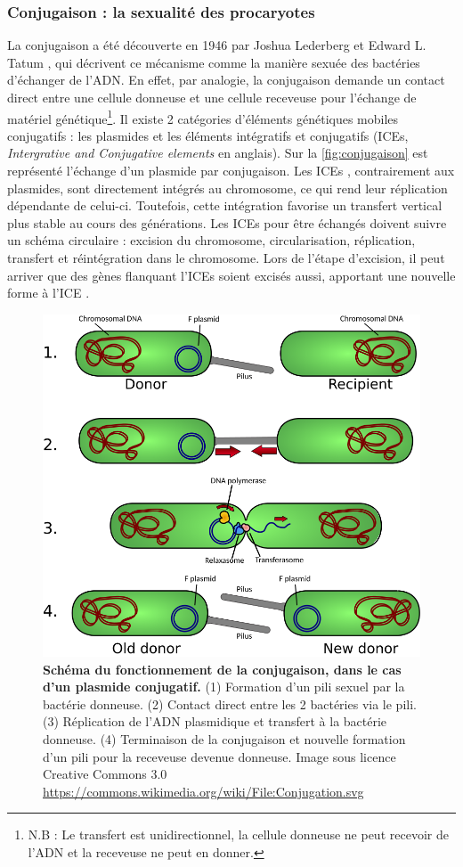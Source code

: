 \subsubsection{Conjugaison : la sexualité des procaryotes}

La conjugaison a été découverte en 1946 par Joshua Lederberg et Edward L. Tatum \cite{lederberg_sex_1953}, qui décrivent ce mécanisme comme la manière sexuée des bactéries d'échanger de l'ADN. En effet, par analogie, la conjugaison demande un contact direct entre une cellule donneuse et une cellule receveuse pour l'échange de matériel génétique\footnote{N.B : Le transfert est unidirectionnel, la cellule donneuse ne peut recevoir de l'ADN et la receveuse ne peut en donner.}. Il existe 2 catégories d'éléments génétiques mobiles conjugatifs : les plasmides et les éléments intégratifs et conjugatifs (ICEs, \textit{Intergrative and Conjugative elements} en anglais). Sur la \autoref{fig:conjugaison} est représenté l'échange d'un plasmide par conjugaison. Les ICEs \cite{johnson_integrative_2015}, contrairement aux plasmides, sont directement intégrés au chromosome, ce qui rend leur réplication dépendante  de celui-ci. Toutefois, cette intégration favorise un transfert vertical plus stable au cours des générations. Les ICEs pour être échangés doivent suivre un schéma circulaire : excision du chromosome, circularisation, réplication, transfert et réintégration dans le chromosome. Lors de l'étape d'excision, il peut arriver que des gènes flanquant l'ICEs soient excisés aussi, apportant une nouvelle forme à l'ICE \cite{gibbons_genomic_2011}.

\begin{figure}[htbp]
    \centering
    \includegraphics[width=0.7\linewidth]{images/Conjugation.png}
    \caption[Schéma du fonctionnement de la conjugaison]{\textbf{Schéma du fonctionnement de la conjugaison, dans le cas d'un plasmide conjugatif.} (1) Formation d'un pili sexuel par la bactérie donneuse. (2) Contact direct entre les 2 bactéries via le pili. (3) Réplication de l'ADN plasmidique et transfert à la bactérie donneuse. (4) Terminaison de la conjugaison et nouvelle formation d'un pili pour la receveuse devenue donneuse. Image sous licence Creative Commons 3.0 \url{https://commons.wikimedia.org/wiki/File:Conjugation.svg}}
    \label{fig:conjugaison}
\end{figure}

